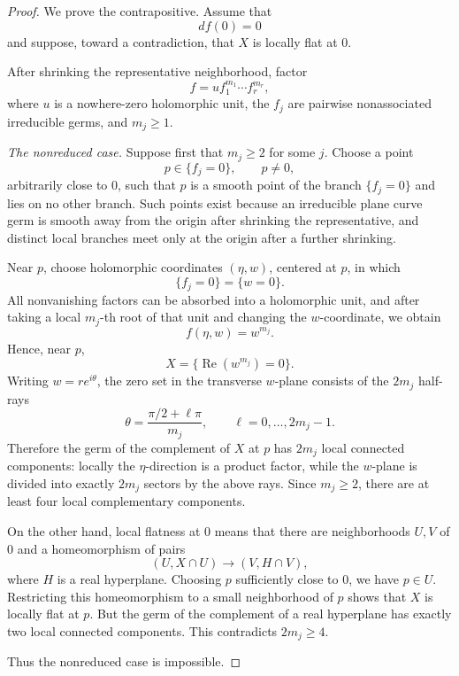 \documentclass[11pt]{amsart}
\theoremstyle{definition}
\theoremstyle{remark}
\begin{document}
\begin{proof}
We prove the contrapositive. Assume that
\[
        df(0)=0
\]
and suppose, toward a contradiction, that \(X\) is locally flat at
\(0\).

After shrinking the representative neighborhood, factor
\[
        f=u f_1^{m_1}\cdots f_r^{m_r},
\]
where \(u\) is a nowhere-zero holomorphic unit, the \(f_j\) are
pairwise nonassociated irreducible germs, and \(m_j\ge1\).

\smallskip
\noindent\emph{The nonreduced case.}
Suppose first that \(m_j\ge2\) for some \(j\). Choose a point
\[
        p\in\{f_j=0\},\qquad p\ne0,
\]
arbitrarily close to \(0\), such that \(p\) is a smooth point of the
branch \(\{f_j=0\}\) and lies on no other branch. Such points exist
because an irreducible plane curve germ is smooth away from the
origin after shrinking the representative, and distinct local
branches meet only at the origin after a further shrinking.

Near \(p\), choose holomorphic coordinates \((\eta,w)\), centered at
\(p\), in which
\[
        \{f_j=0\}=\{w=0\}.
\]
All nonvanishing factors can be absorbed into a holomorphic unit, and
after taking a local \(m_j\)-th root of that unit and changing the
\(w\)-coordinate, we obtain
\[
        f(\eta,w)=w^{m_j}.
\]
Hence, near \(p\),
\[
        X=\{\operatorname{Re}(w^{m_j})=0\}.
\]
Writing \(w=re^{i\theta}\), the zero set in the transverse
\(w\)-plane consists of the \(2m_j\) half-rays
\[
        \theta=\frac{\pi/2+\ell\pi}{m_j},
        \qquad
        \ell=0,\ldots,2m_j-1.
\]
Therefore the germ of the complement of \(X\) at \(p\) has
\(2m_j\) local connected components: locally the \(\eta\)-direction
is a product factor, while the \(w\)-plane is divided into exactly
\(2m_j\) sectors by the above rays. Since \(m_j\ge2\), there are at
least four local complementary components.

On the other hand, local flatness at \(0\) means that there are
neighborhoods \(U,V\) of \(0\) and a homeomorphism of pairs
\[
        (U,X\cap U)\longrightarrow(V,H\cap V),
\]
where \(H\) is a real hyperplane. Choosing \(p\) sufficiently close
to \(0\), we have \(p\in U\). Restricting this homeomorphism to a
small neighborhood of \(p\) shows that \(X\) is locally flat at
\(p\). But the germ of the complement of a real hyperplane has
exactly two local connected components. This contradicts
\(2m_j\ge4\).

Thus the nonreduced case is impossible.


\end{proof}
\end{document}
